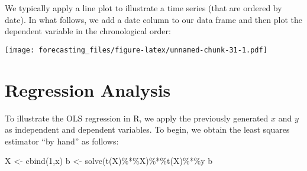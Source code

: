 \documentclass[
  oneside]{book}
\newenvironment{Shaded}{\begin{snugshade}}{\end{snugshade}}
\newcommand{\AttributeTok}[1]{\textcolor[rgb]{0.77,0.63,0.00}{#1}}
\newcommand{\DecValTok}[1]{\textcolor[rgb]{0.00,0.00,0.81}{#1}}
\newcommand{\FunctionTok}[1]{\textcolor[rgb]{0.00,0.00,0.00}{#1}}
\newcommand{\NormalTok}[1]{#1}
\newcommand{\OtherTok}[1]{\textcolor[rgb]{0.56,0.35,0.01}{#1}}
\newcommand{\SpecialCharTok}[1]{\textcolor[rgb]{0.00,0.00,0.00}{#1}}
\newcommand{\StringTok}[1]{\textcolor[rgb]{0.31,0.60,0.02}{#1}}
\begin{document}
We typically apply a line plot to illustrate a time series (that are ordered by date). In what follows, we add a date column to our data frame and then plot the dependent variable in the chronological order:

\begin{Shaded}
\end{Shaded}

\texttt{[image: forecasting\_files/figure-latex/unnamed-chunk-31-1.pdf]}

\hypertarget{regression-analysis}{%
\section*{Regression Analysis}\label{regression-analysis}}

To illustrate the OLS regression in R, we apply the previously generated \(x\) and \(y\) as independent and dependent variables. To begin, we obtain the least squares estimator ``by hand'' as follows:

\begin{Shaded}
\begin{Highlighting}[]
\NormalTok{X }\OtherTok{\textless{}{-}} \FunctionTok{cbind}\NormalTok{(}\DecValTok{1}\NormalTok{,x)}
\NormalTok{b }\OtherTok{\textless{}{-}} \FunctionTok{solve}\NormalTok{(}\FunctionTok{t}\NormalTok{(X)}\SpecialCharTok{\%*\%}\NormalTok{X)}\SpecialCharTok{\%*\%}\FunctionTok{t}\NormalTok{(X)}\SpecialCharTok{\%*\%}\NormalTok{y}
\NormalTok{b}
\end{Highlighting}
\end{Shaded}
\end{document}
